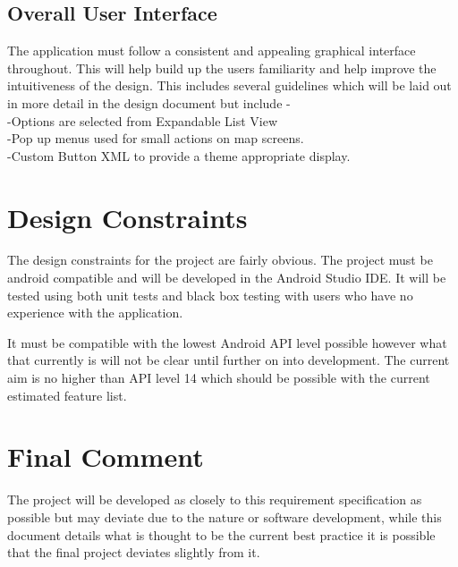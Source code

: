 \subsection{Overall User Interface}
The application must follow a consistent and appealing graphical interface throughout. This will help build up the users familiarity and help improve the intuitiveness of the design. This includes several guidelines which will be laid out in more detail in the design document but include -\\ 
	-Options are selected from Expandable List View\\
	-Pop up menus used for small actions on map screens.\\
	-Custom Button XML to provide a theme appropriate     display.
\section{Design Constraints}
The design constraints for the project are fairly obvious. The project must be android compatible and will be developed in the Android Studio IDE. It will be tested using both unit tests and black box testing with users who have no experience with the application. 

It must be compatible with the lowest Android API level possible however what that currently is will not be clear until further on into development. The current aim is no higher than API level 14 which should be possible with the current estimated feature list.

\section{Final Comment}
The project will be developed as closely to this requirement specification as possible but may deviate due to the nature or software development, while this document details what is thought to be the current best practice it is possible that the final project deviates slightly from it. 
